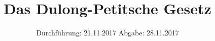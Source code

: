 

\subject{v201}
\title{Das Dulong-Petitsche Gesetz}
\date{%
  Durchführung: 21.11.2017
  \hspace{3em}
  Abgabe: 28.11.2017
}



\maketitle
\thispagestyle{empty}
\tableofcontents
\newpage






\nocite{*}
\printbibliography{}


